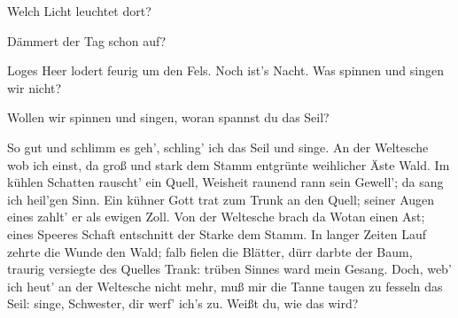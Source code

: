  \begin{drama}
   \let\oldthescene\thescene
   \let\oldscenename\scenename
   \let\oldscenecontentsline\scenecontentsline
   \renewcommand{\scenecontentsline}{}
   \renewcommand{\thescene}{}
   \renewcommand{\scenename}{}
   \let\oldsaythescene\saythescene
   \renewcommand{\saythescene}{Vorspiel}


\DieErsteNornspeaks



Welch Licht leuchtet dort?

\DieZweiteNornspeaks

Dämmert der Tag schon auf?
 

\DieDritteNornspeaks

Loges Heer lodert feurig um den Fels.
Noch ist's Nacht.
Was spinnen und singen wir nicht?
 

\DieZweiteNornspeaks



Wollen wir spinnen und singen,
woran spannst du das Seil?
 

\DieErsteNornspeaks



So gut und schlimm es geh',
schling' ich das Seil und singe.
An der Weltesche wob ich einst,
da groß und stark dem Stamm entgrünte
weihlicher Äste Wald.
Im kühlen Schatten rauscht' ein Quell,
Weisheit raunend rann sein Gewell';
da sang ich heil'gen Sinn.
Ein kühner Gott
trat zum Trunk an den Quell;
seiner Augen eines
zahlt' er als ewigen Zoll.
Von der Weltesche
brach da Wotan einen Ast;
eines Speeres Schaft
entschnitt der Starke dem Stamm.
In langer Zeiten Lauf
zehrte die Wunde den Wald;
falb fielen die Blätter,
dürr darbte der Baum,
traurig versiegte des Quelles Trank:
trüben Sinnes ward mein Gesang.
Doch, web' ich heut'
an der Weltesche nicht mehr,
muß mir die Tanne
taugen zu fesseln das Seil:
singe, Schwester, dir werf' ich's zu.
Weißt du, wie das wird?
 


\end{drama}
